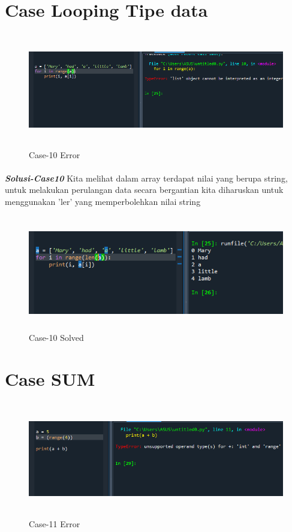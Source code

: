 \documentclass[12pt,a4paper]{article}
\begin{document}
\newpage
\section{Case Looping Tipe data}
\begin{figure}[ht]
    \centerline{\includegraphics[width=15cm,height=5cm]{image/case10.png}}
    \renewcommand{\figurename}{Gambar}
    \caption{Case-10 Error}
\end{figure}
\paragraph{}\textbf{\textit{Solusi-Case10}} {Kita melihat dalam array terdapat nilai yang berupa string, untuk melakukan perulangan data secara bergantian kita diharuskan untuk menggunakan 'ler' yang memperbolehkan nilai string}
\begin{figure}[ht]
    \centerline{\includegraphics[width=15cm,height=5cm]{image/case10-solved.png}}
    \renewcommand{\figurename}{Gambar}
    \caption{Case-10 Solved}
\end{figure}

\newpage
\section{Case SUM}
\begin{figure}[ht]
    \centerline{\includegraphics[width=15cm,height=5cm]{image/case11.png}}
    \renewcommand{\figurename}{Gambar}
    \caption{Case-11 Error}
\end{figure}
\end{document}
